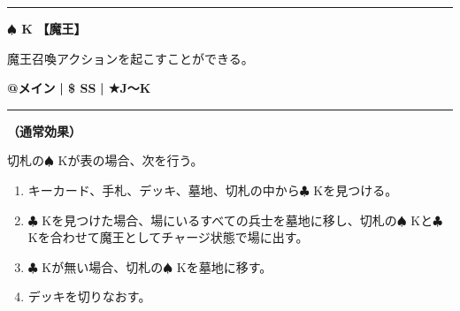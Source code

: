 \documentclass[twocolumn,a5paper,papersize,10pt]{jarticle}
\begin{document}
\vspace{-1zh}

 
 
 
 

\vspace{3mm} %
\hrule height 0.5mm depth 0mm width 66.5mm %
\vspace{1mm} %
{\Large\bf $\spadesuit$ K} {\normalsize\bf【魔王】} %
\vspace{1mm} %

魔王召喚アクションを起こすことができる。

\begin{tcolorbox}[title={\small\bf【Action】魔王召喚}{\scriptsize （召喚）}]

{\scriptsize\bf @メイン }
  {\scriptsize\bf | \$ SS }
  {\scriptsize\bf | ★J〜K}

\vspace{1mm} %
\hrule height 0.1mm depth 0mm width 62mm %
\vspace{1mm} %

{\bf（通常効果）}

切札の{\normalsize $\spadesuit$} Kが表の場合、次を行う。


\vspace{-1zh}%
\begin{enumerate}
\setlength{\leftskip}{-0.3cm}
\setlength{\parskip}{0pt} %

\item キーカード、手札、デッキ、墓地、切札の中から{\normalsize $\clubsuit$} Kを見つける。

\item {\normalsize $\clubsuit$} Kを見つけた場合、場にいるすべての兵士を墓地に移し、切札の{\normalsize $\spadesuit$} Kと{\normalsize $\clubsuit$} Kを合わせて魔王としてチャージ状態で場に出す。

\item {\normalsize $\clubsuit$} Kが無い場合、切札の{\normalsize $\spadesuit$} Kを墓地に移す。

\item デッキを切りなおす。
\vspace{-1zh}%
\end{enumerate}

\vspace{1mm} %
\end{tcolorbox}

\vspace{-1zh}
\end{document}
